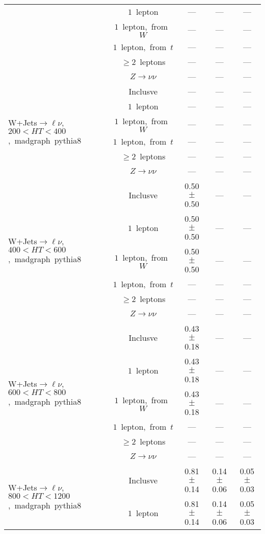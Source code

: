 \documentclass{article}
\begin{document}
\begin{longtable}{|l|c|c|c|c|}
 & $1$~lepton  & ---  & ---  & --- \\* 
 & $1$~lepton,~from~$W$  & ---  & ---  & --- \\* 
 & $1$~lepton,~from~$t$  & ---  & ---  & --- \\* 
 & $\ge2$~leptons  & ---  & ---  & --- \\* 
 & $Z\rightarrow\nu\nu$  & ---  & ---  & --- \\* 
\hline 
\multirow{6}{*}{W+Jets$\rightarrow\ell\nu$,~$200<HT<400$,~madgraph~pythia8} & Inclusve  & ---  & ---  & --- \\* 
 & $1$~lepton  & ---  & ---  & --- \\* 
 & $1$~lepton,~from~$W$  & ---  & ---  & --- \\* 
 & $1$~lepton,~from~$t$  & ---  & ---  & --- \\* 
 & $\ge2$~leptons  & ---  & ---  & --- \\* 
 & $Z\rightarrow\nu\nu$  & ---  & ---  & --- \\* 
\hline 
\multirow{6}{*}{W+Jets$\rightarrow\ell\nu$,~$400<HT<600$,~madgraph~pythia8} & Inclusve  & 0.50 $\pm$ 0.50  & ---  & --- \\* 
 & $1$~lepton  & 0.50 $\pm$ 0.50  & ---  & --- \\* 
 & $1$~lepton,~from~$W$  & 0.50 $\pm$ 0.50  & ---  & --- \\* 
 & $1$~lepton,~from~$t$  & ---  & ---  & --- \\* 
 & $\ge2$~leptons  & ---  & ---  & --- \\* 
 & $Z\rightarrow\nu\nu$  & ---  & ---  & --- \\* 
\hline 
\multirow{6}{*}{W+Jets$\rightarrow\ell\nu$,~$600<HT<800$,~madgraph~pythia8} & Inclusve  & 0.43 $\pm$ 0.18  & ---  & --- \\* 
 & $1$~lepton  & 0.43 $\pm$ 0.18  & ---  & --- \\* 
 & $1$~lepton,~from~$W$  & 0.43 $\pm$ 0.18  & ---  & --- \\* 
 & $1$~lepton,~from~$t$  & ---  & ---  & --- \\* 
 & $\ge2$~leptons  & ---  & ---  & --- \\* 
 & $Z\rightarrow\nu\nu$  & ---  & ---  & --- \\* 
\hline 
\multirow{6}{*}{W+Jets$\rightarrow\ell\nu$,~$800<HT<1200$,~madgraph~pythia8} & Inclusve  & 0.81 $\pm$ 0.14  & 0.14 $\pm$ 0.06  & 0.05 $\pm$ 0.03 \\* 
 & $1$~lepton  & 0.81 $\pm$ 0.14  & 0.14 $\pm$ 0.06  & 0.05 $\pm$ 0.03 \\* 

\end{longtable}
\end{document}
